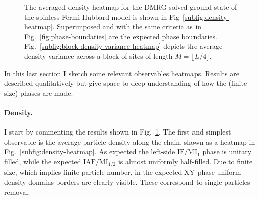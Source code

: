 \begin{figure}
	\centering
	\caption{The averaged density heatmap for the DMRG solved ground state of the spinless Fermi-Hubbard model is shown in Fig~\ref{subfig:density-heatmap}. Superimposed and with the same criteria as in Fig.~\ref{fig:phase-boundaries} are the expected phase boundaries. Fig.~\ref{subfig:block-density-variance-heatmap} depicts the average density variance across a block of sites of length $M = \lfloor L/4 \rfloor$.}
	\label{fig:density-heatmaps}
\end{figure}

In this last section I sketch some relevant observables heatmaps. Results are described qualitatively but give space to deep understanding of how the (finite-size) phases are made.

\paragraph{Density.} I start by commenting the results shown in Fig.~\ref{fig:density-heatmaps}. The first and simplest observable is the average particle density along the chain, shown as a heatmap in Fig.~\ref{subfig:density-heatmap}. As expected the left-side $\mathrm{IF}/\mathrm{MI}_1$ phase is unitary filled, while the expected $\mathrm{IAF}/\mathrm{MI}_{1/2}$ is almost uniformly half-filled. Due to finite size, which implies finite particle number, in the expected $\mathrm{XY}$ phase uniform-density domains borders are clearly visible. These correspond to single particles removal.

